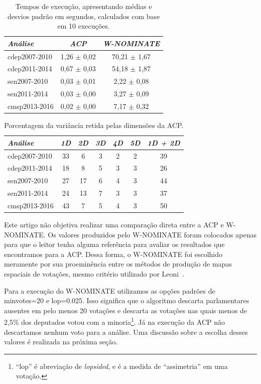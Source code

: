 \documentclass[a4paper, 12pt]{article}
\newcommand\wnominate{W-NOMINATE\xspace}
\begin{document}
\begin{table}
\centering
\begin{tabular}{l c c}
\itshape Análise & \itshape ACP & \itshape \wnominate \\
\hline
cdep2007-2010 & 1,26 $\pm$ 0,02 & 70,21 $\pm$ 1,67 \\ 
cdep2011-2014 & 0,67 $\pm$ 0,03 & 54,18 $\pm$ 1,87 \\ 
sen2007-2010  & 0,03 $\pm$ 0,01 & 2,22 $\pm$ 0,08  \\ 
sen2011-2014  & 0,03 $\pm$ 0,00 & 3,27 $\pm$ 0,09  \\ 
cmsp2013-2016 & 0,02 $\pm$ 0,00 & 7,17 $\pm$ 0,32  \\ 
\end{tabular} 
\caption{Tempos de execução, apresentando médias e desvios padrão em segundos, calculados com base em 10 execuções.}
\label{tab:tempos}
\end{table}


\begin{table}
\centering
\begin{tabular}{l c c c c c | c}
\itshape Análise & \itshape 1D & \itshape 2D & \itshape 3D & \itshape 4D & \itshape 5D & \itshape 1D + 2D \\
\hline
cdep2007-2010 & 33 &  6 & 3 & 2 & 2 & 39  \\ 
cdep2011-2014 & 18 &  8 & 5 & 3 & 3 & 26  \\ 
sen2007-2010  & 27 & 17 & 6 & 4 & 3 & 44  \\ 
sen2011-2014  & 24 & 13 & 7 & 3 & 3 & 37  \\ 
cmsp2013-2016 & 43 &  7 & 5 & 4 & 3 & 50  \\ 
\end{tabular} 
\caption{Porcentagem da variância retida pelas dimensões da ACP.}
\label{tab:variacao-explicada-acp}
\end{table}

Este artigo não objetiva realizar uma comparação direta entre a ACP e \wnominate. Os valores produzidos pelo \wnominate foram colocados apenas para que o leitor tenha alguma referência para avaliar os resultados que encontramos para a ACP. Dessa forma, o \wnominate foi escolhido meramente por sua proeminência entre os métodos de produção de mapas espaciais de votações, mesmo critério utilizado por Leoni~\cite{leoni02cdep}.

Para a execução do \wnominate utilizamos as opções padrões de \textsf{minvotes=20} e \textsf{lop=0.025}. Isso significa que o algoritmo descarta parlamentares ausentes em pelo menos 20 votações e descarta as votações nas quais menos de 2,5\% dos deputados votou com a minoria\footnote{``lop'' é abreviação de \emph{lopsided}, e é a medida de ``assimetria'' em uma votação.}. Já na execução da ACP não descartamos nenhum voto para a análise. Uma discussão sobre a escolha desses valores é realizada na próxima seção.
\end{document}
